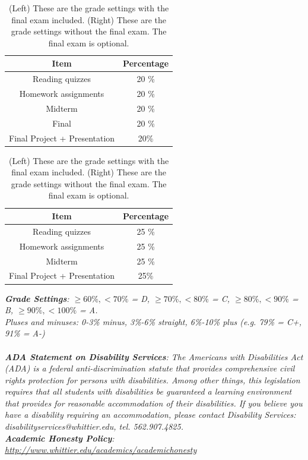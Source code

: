 \documentclass[10pt]{article}
\begin{document}
\begin{table}[h]
\centering
\begin{tabular}{| c | c |}
\hline
Item & Percentage \\ \hline \hline
Reading quizzes & 20 \% \\ \hline
Homework assignments & 20 \% \\ \hline
Midterm & 20 \% \\ \hline
Final & 20 \% \\ \hline
Final Project + Presentation & 20\% \\ \hline
\end{tabular}
\begin{tabular}{| c | c |}
\hline
Item & Percentage \\ \hline \hline
Reading quizzes & 25 \% \\ \hline
Homework assignments & 25 \% \\ \hline
Midterm & 25 \% \\ \hline
Final Project + Presentation & 25\% \\ \hline
\end{tabular}
\caption{\label{tab:grades} (Left) These are the grade settings with the final exam included. (Right) These are the grade settings without the final exam.  The final exam is optional.}
\end{table}
\vspace{0.5cm}
\textit{\textbf{Grade Settings}: $\geq 60\%, <70\%$ = D, $\geq 70\%, <80\%$ = C, $\geq 80\%, <90\%$ = B, $\geq 90\%, <100\%$ = A.  \\ Pluses and minuses: 0-3\% minus, 3\%-6\% straight, 6\%-10\% plus (e.g. 79\% = C+, 91\% = A-)} \\ \\
\textit{\textbf{ADA Statement on Disability Services}: The Americans with Disabilities Act (ADA) is a federal anti-discrimination statute that provides comprehensive civil rights protection for persons with disabilities. Among other things, this legislation requires that all students with disabilities be guaranteed a learning environment that provides for reasonable accommodation of their disabilities. If you believe you have a disability requiring an accommodation, please contact Disability Services: disabilityservices@whittier.edu, tel. 562.907.4825.} \\
\textit{\textbf{Academic Honesty Policy}: \url{http://www.whittier.edu/academics/academichonesty}}

\clearpage
\end{document}
